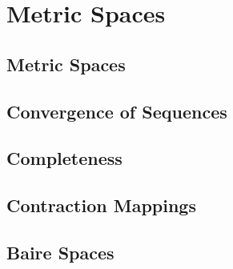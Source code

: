 \chapter{Metric Spaces}

\section{Metric Spaces}



\section{Convergence of Sequences}



\section{Completeness}



\section{Contraction Mappings}



\section{Baire Spaces}



